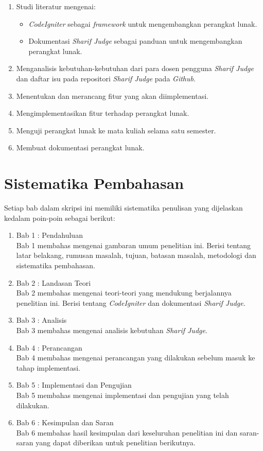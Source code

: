 \begin{enumerate}
	\item Studi literatur mengenai:
		\begin{itemize}
			\item \textit{CodeIgniter} sebagai \textit{framework} untuk mengembangkan perangkat lunak.
			\item Dokumentasi \textit{Sharif Judge} sebagai panduan untuk mengembangkan perangkat lunak.
		\end{itemize}
	\item Menganalisis kebutuhan-kebutuhan dari para dosen pengguna \textit{Sharif Judge} dan daftar isu pada repositori \textit{Sharif Judge} pada \textit{Github}.
	\item Menentukan dan merancang fitur yang akan diimplementasi.
	\item Mengimplementasikan fitur terhadap perangkat lunak.
	\item Menguji perangkat lunak ke mata kuliah selama satu semester.
	\item Membuat dokumentasi perangkat lunak.
\end{enumerate}

\section{Sistematika Pembahasan}
\label{sec:sispem}
Setiap bab dalam skripsi ini memiliki sistematika penulisan yang dijelaskan kedalam poin-poin sebagai berikut:

\begin{enumerate}
	\item Bab 1 : Pendahuluan \\
	Bab 1 membahas mengenai gambaran umum penelitian ini. Berisi tentang latar belakang, rumusan masalah, tujuan, batasan masalah, metodologi dan sistematika pembahasan.
	
	\item Bab 2 : Landasan Teori \\
	Bab 2 membahas mengenai teori-teori yang mendukung berjalannya penelitian ini. Berisi tentang \textit{CodeIgniter} dan dokumentasi \textit{Sharif Judge}.
	
	\item Bab 3 : Analisis \\
	Bab 3 membahas mengenai analisis kebutuhan \textit{Sharif Judge}.
	
	\item Bab 4 : Perancangan \\
	Bab 4 membahas mengenai perancangan yang dilakukan sebelum masuk ke tahap implementasi.
	
	\item Bab 5 : Implementasi dan Pengujian \\
	Bab 5 membahas mengenai implementasi dan pengujian yang telah dilakukan.
	
	\item Bab 6 : Kesimpulan dan Saran \\
	Bab 6 membahas hasil kesimpulan dari keseluruhan penelitian ini dan saran-saran yang dapat diberikan untuk penelitian berikutnya.
\end{enumerate}
